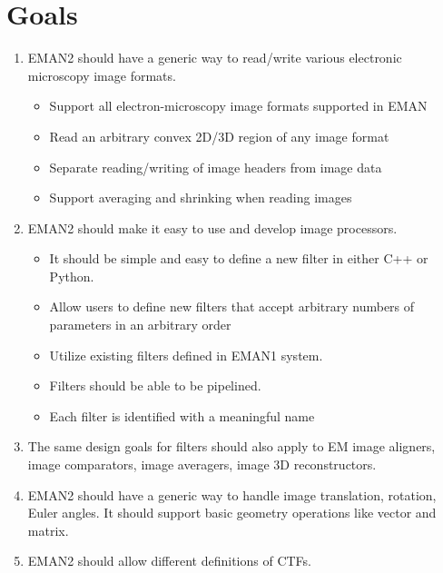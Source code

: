 %

\section{Goals}
  \label{GOALS}

\begin{enumerate}
  \item 
    EMAN2 should have a generic way to read/write various electronic
    microscopy image formats.
    \begin{itemize}
      \item
	Support all electron-microscopy image formats supported in EMAN
      \item
	Read an arbitrary convex 2D/3D region of any image format
      \item
	Separate reading/writing of image headers from image data
      \item
	Support averaging and shrinking when reading images
    \end{itemize}

    \item
      EMAN2 should make it easy to use and develop image processors.
      \begin{itemize}
	\item
	  It should be simple and easy to define a new filter in
	  either C++ or Python.
	\item
	  Allow users to define new filters that accept arbitrary numbers
	  of parameters in an arbitrary order
	\item
	  Utilize existing filters defined in EMAN1 system.
	\item
	  Filters should be able to be pipelined.
	\item
	  Each filter is identified with a meaningful name
      \end{itemize}

    \item
      The same design goals for filters should also apply to EM image
      aligners, image comparators, image averagers, image 3D
      reconstructors.

    \item
      EMAN2 should have a generic way to handle image translation,
      rotation, Euler angles. It should support basic geometry
      operations like vector and matrix.

    \item
      EMAN2 should allow different definitions of CTFs.


\end{enumerate}
